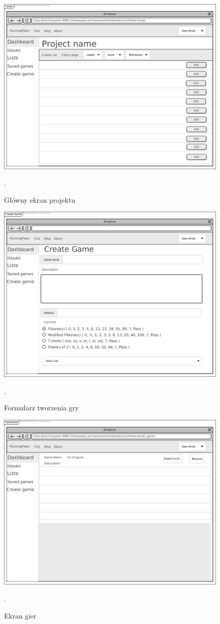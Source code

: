 \begin{figure}[H]
	\centering\includegraphics[width=.7\textwidth]{img/IssuesScreen}
	\caption{Główny ekran projektu}.\label{rys:IssuesScreen}
\end{figure}
\begin{figure}[H]
	\centering\includegraphics[width=.7\textwidth]{img/gameCreate}
	\caption{Formularz tworzenia gry}.\label{rys:gameCreate}
\end{figure}
\begin{figure}[H]
	\centering\includegraphics[width=.7\textwidth]{img/GamesList}
	\caption{Ekran gier}.\label{rys:GamesList}
\end{figure}
